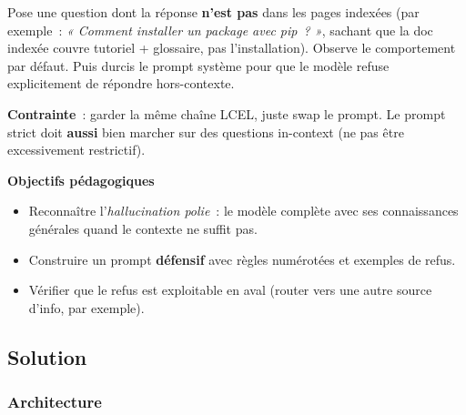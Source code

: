 \documentclass[11pt,a4paper]{article}
\begin{document}
\begin{tcolorbox}[title=Exercice bonus 3. Bloquer les hallucinations polies]
Pose une question dont la réponse \textbf{n'est pas} dans les pages
indexées (par exemple~: \emph{« Comment installer un package avec
pip~? »}, sachant que la doc indexée couvre tutoriel + glossaire, pas
l'installation). Observe le comportement par défaut. Puis durcis le
prompt système pour que le modèle refuse explicitement de répondre
hors-contexte.

\textbf{Contrainte}~: garder la même chaîne LCEL, juste swap le prompt.
Le prompt strict doit \textbf{aussi} bien marcher sur des questions
in-context (ne pas être excessivement restrictif).

\bigskip
\noindent\textbf{Objectifs pédagogiques}
\begin{itemize}[leftmargin=*]
  \item Reconnaître l'\emph{hallucination polie}~: le modèle complète
        avec ses connaissances générales quand le contexte ne suffit pas.
  \item Construire un prompt \textbf{défensif} avec règles numérotées
        et exemples de refus.
  \item Vérifier que le refus est exploitable en aval (router vers une
        autre source d'info, par exemple).
\end{itemize}
\end{tcolorbox}

\subsection{Solution}

\subsubsection{Architecture}
\end{document}
